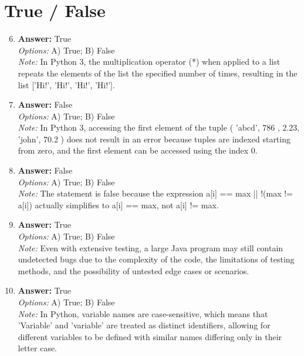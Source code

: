 \documentclass[12pt]{article}
\begin{document}
\section*{True / False}
\begin{enumerate}[label=\arabic*.]
\setcounter{enumi}{5}
\item \textbf{Answer:} True
\\ \textit{Options:} A) True; B) False
\\ \textit{Note:} In Python 3, the multiplication operator (*) when applied to a list repeats the elements of the list the specified number of times, resulting in the list ['Hi!', 'Hi!', 'Hi!', 'Hi!'].
\item \textbf{Answer:} False
\\ \textit{Options:} A) True; B) False
\\ \textit{Note:} In Python 3, accessing the first element of the tuple ( 'abcd', 786 , 2.23, 'john', 70.2 ) does not result in an error because tuples are indexed starting from zero, and the first element can be accessed using the index 0.
\item \textbf{Answer:} False
\\ \textit{Options:} A) True; B) False
\\ \textit{Note:} The statement is false because the expression a[i] == max || !(max != a[i]) actually simplifies to a[i] == max, not a[i] != max.
\item \textbf{Answer:} True
\\ \textit{Options:} A) True; B) False
\\ \textit{Note:} Even with extensive testing, a large Java program may still contain undetected bugs due to the complexity of the code, the limitations of testing methods, and the possibility of untested edge cases or scenarios.
\item \textbf{Answer:} True
\\ \textit{Options:} A) True; B) False
\\ \textit{Note:} In Python, variable names are case-sensitive, which means that 'Variable' and 'variable' are treated as distinct identifiers, allowing for different variables to be defined with similar names differing only in their letter case.
\end{enumerate}
\end{document}
